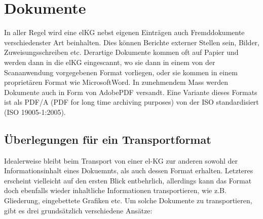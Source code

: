 \documentclass[a4paper]{scrartcl}
\begin{document}
\section{Dokumente}
In aller Regel wird eine elKG nebst eigenen Einträgen auch Fremddokumente verschiedenster Art beinhalten. Dies können Berichte externer Stellen sein, Bilder, Zuweisungsschreiben etc. Derartige Dokumente kommen oft auf Papier und werden dann in die elKG eingescannt, wo sie dann in einem von der Scananwendung vorgegebenen Format vorliegen, oder sie kommen in einem proprietären Format wie Microsoft\texttrademark Word\texttrademark. In zunehmendem Mass werden Dokumente auch in Form von Adobe\texttrademark PDF versandt. Eine Variante dieses Formats ist als PDF/A (PDF for long time archiving purposes) von der ISO standardisiert (ISO 19005-1:2005).
\subsection{Überlegungen für ein Transportformat}
Idealerweise bleibt beim Transport von einer el-KG zur anderen sowohl der Informationsinhalt eines Dokuemnts, als auch dessen Format erhalten. Letzteres erscheint vielleicht auf den ersten Blick entbehrlich, allerdings kann das Format doch ebenfalls wieder inhaltliche Informationen transportieren, wie z.B. Gliederung, eingebettete Grafiken etc. Um solche Dokumente zu transportieren, gibt es drei grundsätzlich verschiedene Ansätze:
\end{document}
